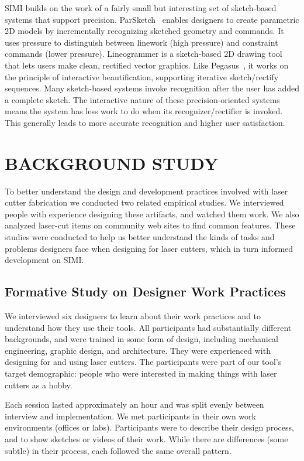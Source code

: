 \documentclass{article}
\begin{document}
SIMI builds on the work of a fairly small but interesting set of
sketch-based systems that support
precision. ParSketch~\cite{naya-parsketch} enables designers to create
parametric 2D models by incrementally recognizing sketched geometry
and commands. It uses pressure to distinguish between linework (high
pressure) and constraint commands (lower pressure). Lineogrammer is a
sketch-based 2D drawing tool that lets users make clean, rectified
vector graphics. Like Pegasus~\cite{igarashi-pegasus}, it works on the
principle of interactive beautification, supporting iterative
sketch/rectify sequences. Many sketch-based systems invoke recognition
after the user has added a complete sketch. The interactive nature of
these precision-oriented systems means the system has less work to do
when its recognizer/rectifier is invoked. This generally leads to more
accurate recognition and higher user satisfaction.

\section{BACKGROUND STUDY}

To better understand the design and development practices involved
with laser cutter fabrication we conducted two related empirical
studies. We interviewed people with experience designing these
artifacts, and watched them work. We also analyzed laser-cut items on
community web sites to find common features. These studies were
conducted to help us better understand the kinds of tasks and problems
designers face when designing for laser cutters, which in turn
informed development on SIMI.

\subsection{Formative Study on Designer Work Practices}
\label{sec:formative}

We interviewed six designers to learn about their work practices and
to understand how they use their tools. All participants had
substantially different backgrounds, and were trained in some form of
design, including mechanical engineering, graphic design, and
architecture. They were experienced with designing for and using laser
cutters. The participants were part of our tool's target demographic:
people who were interested in making things with laser cutters as a
hobby. 

Each session lasted approximately an hour and was split evenly between
interview and implementation. We met participants in their own work
environments (offices or labs). Participants were to describe their
design process, and to show sketches or videos of their work. While
there are differences (some subtle) in their process, each followed
the same overall pattern.
\end{document}
